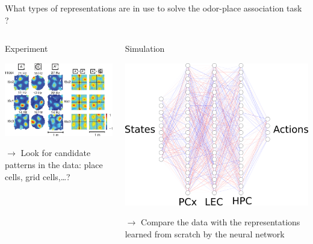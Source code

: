 \documentclass[bigger]{beamer}
\begin{document}
\begin{frame}[label={sec:org8f938e3}]{What types of representations are in use to solve the odor-place association task ?}
\begin{columns}
\begin{column}[t]{0.5\columnwidth}
\begin{center}
Experiment
\end{center}
\begin{center}
\includegraphics[height=0.25\textheight]{img/place-cells-grid-cells.jpg.png}
\end{center}
\(\to\) Look for candidate patterns in the data: place cells, grid cells,\dots{}?
\end{column}
\begin{column}[t]{0.5\columnwidth}
\begin{center}
Simulation
\end{center}
\begin{center}
\includegraphics[height=0.25\textheight]{img/nn.svg.png}
\end{center}
\(\to\) Compare the data with the representations learned from scratch by the neural network


\end{column}
\end{columns}
\end{frame}
\end{document}
